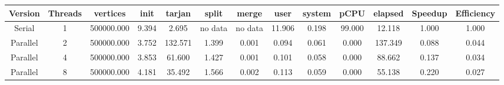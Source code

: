 \begin{tabular}{|c|c|c|c|c|c|c|c|c|c|c|c|c|}
\toprule
 Version &  Threads &   vertices &  init &  tarjan &   split &   merge &   user &  system &   pCPU &  elapsed &  Speedup &  Efficiency \\
\midrule
  Serial &        1 & 500000.000 & 9.394 &   2.695 & no data & no data & 11.906 &   0.198 & 99.000 &   12.118 &    1.000 &       1.000 \\
Parallel &        2 & 500000.000 & 3.752 & 132.571 &   1.399 &   0.001 &  0.094 &   0.061 &  0.000 &  137.349 &    0.088 &       0.044 \\
Parallel &        4 & 500000.000 & 3.853 &  61.600 &   1.427 &   0.001 &  0.101 &   0.058 &  0.000 &   88.662 &    0.137 &       0.034 \\
Parallel &        8 & 500000.000 & 4.181 &  35.492 &   1.566 &   0.002 &  0.113 &   0.059 &  0.000 &   55.138 &    0.220 &       0.027 \\
\bottomrule
\end{tabular}
